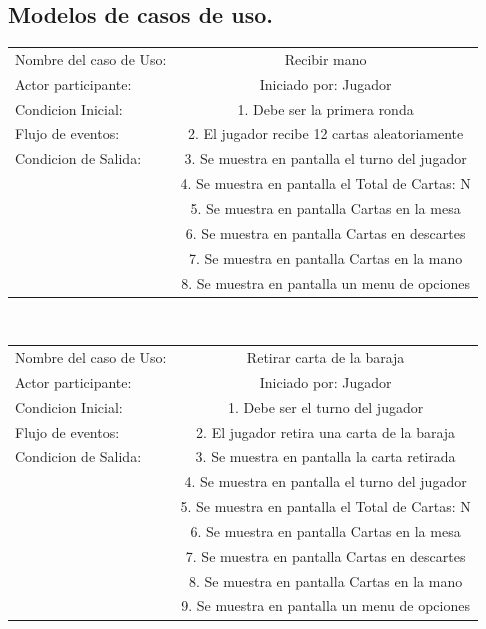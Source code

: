 \documentclass[60pt]{article}
\begin{document}
\subsection{Modelos de casos de uso.}\label{cap:modelos-casos-uso}
\begin{center}
    \begin{tabular}{ l | c  }
        
        Nombre del caso de Uso: & Recibir mano \\
        Actor participante: & Iniciado por: Jugador \\\hline
        Condicion Inicial: & 1. Debe ser la primera ronda    \\
        Flujo de eventos: & 2. El jugador recibe 12 cartas aleatoriamente \\\hline
        Condicion de Salida: & 3. Se muestra en pantalla el turno del jugador \\
        & 4. Se muestra en pantalla el Total de Cartas: N \\
        & 5. Se muestra en pantalla Cartas en la mesa \\
        & 6. Se muestra en pantalla Cartas en descartes \\
        & 7. Se muestra en pantalla Cartas en la mano \\
        & 8. Se muestra en pantalla un menu de opciones \\ 
    \end{tabular} \\
\end{center}
\begin{center}
    \begin{tabular}{ l | c  }
        
        Nombre del caso de Uso: & Retirar carta de la baraja \\
        Actor participante: & Iniciado por: Jugador \\\hline
        Condicion Inicial: & 1. Debe ser el turno del jugador    \\
        Flujo de eventos: & 2. El jugador retira una carta de la baraja \\\hline
        Condicion de Salida: & 3. Se muestra en pantalla la carta retirada \\
        & 4. Se muestra en pantalla el turno del jugador \\
        & 5. Se muestra en pantalla el Total de Cartas: N \\
        & 6. Se muestra en pantalla Cartas en la mesa \\
        & 7. Se muestra en pantalla Cartas en descartes \\
        & 8. Se muestra en pantalla Cartas en la mano \\
        & 9. Se muestra en pantalla un menu de opciones \\ 
    \end{tabular} \\
\end{center}
\end{document}
